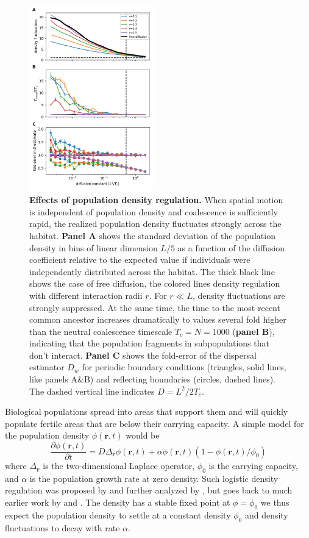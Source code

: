 \documentclass[aps,rmp, twocolumn]{revtex4}
\newcommand{\rvec}{\mathbf{r}}
\begin{document}
\begin{figure}
    \includegraphics[width=0.48\textwidth]{figures/stable_density}
    \caption{\label{fig:density_reg}  {\bf Effects of population density regulation.}
    When spatial motion is independent of population density and coalescence is sufficiently rapid, the realized population density fluctuates strongly across the habitat.
    {\bf Panel A} shows the standard deviation of the population density in bins of linear dimension $L/5$ as a function of the diffusion coefficient relative to the expected value if individuals were independently distributed across the habitat. The thick black line shows the case of free diffusion, the colored lines density regulation with different interaction radii $r$. For $r\ll L$, density fluctuations are strongly suppressed.
    At the same time, the time to the most recent common ancestor increases dramatically to values several fold higher than the neutral coalescence timescale $T_c=N=1000$ ({\bf panel B}), indicating that the population fragments in subpopulations that don't interact.
    {\bf Panel C} shows the fold-error of the dispersal estimator $D_w$ for periodic boundary conditions (triangles, solid lines, like panels A\&B) and reflecting boundaries (circles, dashed lines).
    The dashed vertical line indicates $D=L^2/2T_c$.}
\end{figure}

Biological populations spread into areas that support them and will quickly populate fertile areas that are below their carrying capacity.
A simple model for the population density $\phi(\rvec,t)$ would be
\begin{equation}
    \label{eq:FKPP}
    \frac{\partial \phi(\rvec,t)}{\partial t} = D \Delta_{\rvec} \phi(\rvec,t) + \alpha \phi(\rvec,t)(1-\phi(\rvec,t)/\phi_0)
\end{equation}
where $ \Delta_{\rvec}$ is the two-dimensional Laplace operator, $\phi_0$ is the carrying capacity, and $\alpha$ is the population growth rate at zero density.
Such logistic density regulation was proposed by \citet{bolker_using_1997} and further analyzed by \citet{etheridge_survival_2004}, but goes back to much earlier work by \citet{fisher_wave_1937} and \citet{KPP1937}.
The density has a stable fixed point at $\phi=\phi_0$ we thus expect the population density to settle at a constant density $\phi_0$ and density fluctuations to decay with rate $\alpha$.
\end{document}
